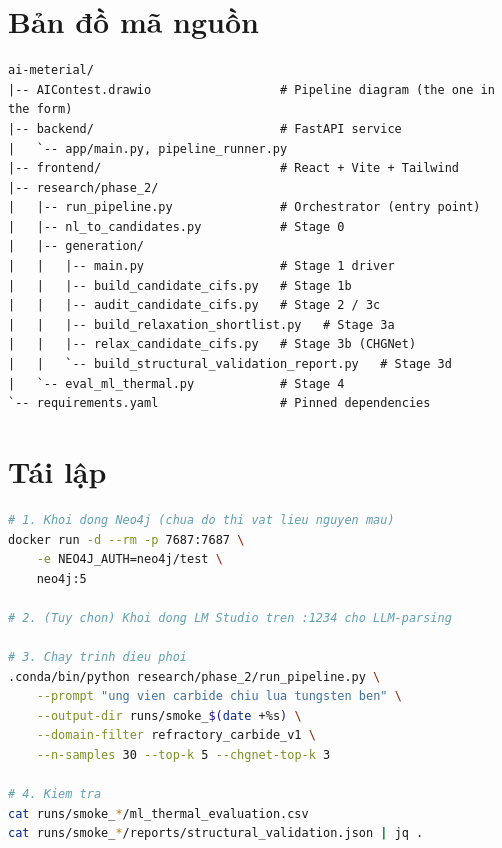 \documentclass[11pt,a4paper]{report}
\begin{document}
\chapter{Bản đồ mã nguồn}
\begin{lstlisting}[language={},caption={Bố cục repo ở mức cao nhất.},label={lst:tree}]
ai-meterial/
|-- AIContest.drawio                  # Pipeline diagram (the one in the form)
|-- backend/                          # FastAPI service
|   `-- app/main.py, pipeline_runner.py
|-- frontend/                         # React + Vite + Tailwind
|-- research/phase_2/
|   |-- run_pipeline.py               # Orchestrator (entry point)
|   |-- nl_to_candidates.py           # Stage 0
|   |-- generation/
|   |   |-- main.py                   # Stage 1 driver
|   |   |-- build_candidate_cifs.py   # Stage 1b
|   |   |-- audit_candidate_cifs.py   # Stage 2 / 3c
|   |   |-- build_relaxation_shortlist.py   # Stage 3a
|   |   |-- relax_candidate_cifs.py   # Stage 3b (CHGNet)
|   |   `-- build_structural_validation_report.py   # Stage 3d
|   `-- eval_ml_thermal.py            # Stage 4
`-- requirements.yaml                 # Pinned dependencies
\end{lstlisting}

\chapter{Tái lập}

\begin{lstlisting}[language=bash,caption={Tái lập một lượt chạy từ đầu.},label={lst:repro}]
# 1. Khoi dong Neo4j (chua do thi vat lieu nguyen mau)
docker run -d --rm -p 7687:7687 \
    -e NEO4J_AUTH=neo4j/test \
    neo4j:5

# 2. (Tuy chon) Khoi dong LM Studio tren :1234 cho LLM-parsing

# 3. Chay trinh dieu phoi
.conda/bin/python research/phase_2/run_pipeline.py \
    --prompt "ung vien carbide chiu lua tungsten ben" \
    --output-dir runs/smoke_$(date +%s) \
    --domain-filter refractory_carbide_v1 \
    --n-samples 30 --top-k 5 --chgnet-top-k 3

# 4. Kiem tra
cat runs/smoke_*/ml_thermal_evaluation.csv
cat runs/smoke_*/reports/structural_validation.json | jq .
\end{lstlisting}
\end{document}
